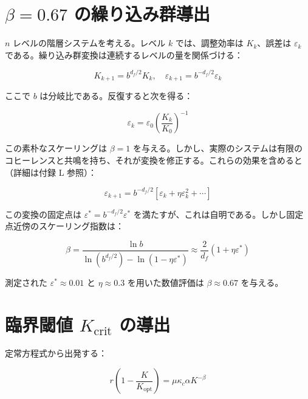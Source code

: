\documentclass[12pt,a4paper]{article}
\newcommand{\Keffcrit}{K_{\mathrm{crit}}}
\newcommand{\kappac}{\kappa_c}
\newcommand{\eps}{\varepsilon}
\newcommand{\df}{d_{\!f}}
\theoremstyle{remark}
\begin{document}
	\appendix
	
	\section{\(\beta = 0.67\) の繰り込み群導出}
	\label{app:rg}
	
	\(n\) レベルの階層システムを考える。レベル \(k\) では、調整効率は \(K_k\)、誤差は \(\eps_k\) である。繰り込み群変換は連続するレベルの量を関係づける：
	
	\begin{equation}
		K_{k+1} = b^{\df/2} K_k, \quad \eps_{k+1} = b^{-\df/2} \eps_k
		\label{eq:rg}
	\end{equation}
	
	ここで \(b\) は分岐比である。反復すると次を得る：
	
	\begin{equation}
		\eps_k = \eps_0 \left( \frac{K_k}{K_0} \right)^{-1}
		\label{eq:rg-naive}
	\end{equation}
	
	この素朴なスケーリングは \(\beta = 1\) を与える。しかし、実際のシステムは有限のコヒーレンスと共鳴を持ち、それが変換を修正する。これらの効果を含めると（詳細は付録 L 参照）：
	
	\begin{equation}
		\eps_{k+1} = b^{-\df/2} \left[ \eps_k + \eta \eps_k^2 + \cdots \right]
		\label{eq:rg-corrected}
	\end{equation}
	
	この変換の固定点は \(\eps^* = b^{-\df/2} \eps^*\) を満たすが、これは自明である。しかし固定点近傍のスケーリング指数は：
	
	\begin{equation}
		\beta = \frac{\ln b}{\ln(b^{\df/2}) - \ln(1 - \eta \eps^*)} \approx \frac{2}{\df} (1 + \eta \eps^*)
		\label{eq:rg-beta}
	\end{equation}
	
	測定された \(\eps^* \approx 0.01\) と \(\eta \approx 0.3\) を用いた数値評価は \(\beta \approx 0.67\) を与える。
	
	\section{臨界閾値 \(\Keffcrit\) の導出}
	\label{app:Kcrit}
	
	定常方程式から出発する：
	
	\begin{equation}
		r \left(1 - \frac{K}{K_{\text{opt}}}\right) = \mu \kappac \alpha K^{-\beta}
		\label{eq:stationary-app}
	\end{equation}
	
\end{document}
